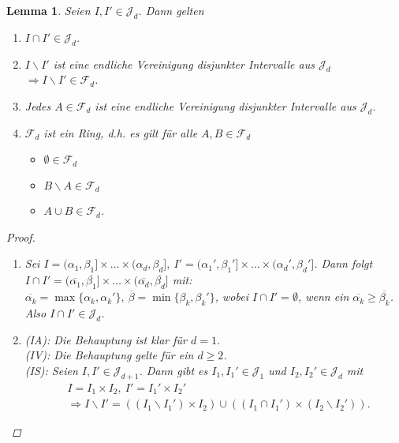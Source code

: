 \documentclass[a4paper]{report}
\newcommand{\Fd}{\mathcal{F}_d}
\newcommand{\Jd}{\mathcal{J}_d}
\newcommand{\jlabel}[1]{\label{j_#1}}
\theoremstyle{plain}
\newtheorem{lem}[thm]{Lemma}
\theoremstyle{definition}
\begin{document}
{{{\begin{lem}
\jlabel{Lem 1.15}
    Seien $I, I' \in \Jd$. Dann gelten
    \begin{enumerate}
        \item $I \cap I' \in \Jd$.
        \item $I\backslash I'$ ist eine endliche Vereinigung disjunkter Intervalle aus $\Jd$ $\Rightarrow I \backslash I' \in \Fd$.
        \item Jedes $A\in \Fd$ ist eine endliche Vereinigung disjunkter Intervalle aus $\Jd$.
        \item 
            $\Fd$ ist ein Ring, d.h. es gilt für alle $A,B\in \Fd$
            \begin{itemize}
                \item[(R1)] $\emptyset \in \Fd$
                \item[(R2)] $B\backslash A \in \Fd$
                \item[(R3)] $A \cup B \in \Fd$.
            \end{itemize}
    \end{enumerate}
    \begin{proof}
        \begin{enumerate}
            \item 
                Sei $I = (\alpha_1, \beta_1] \times \dots \times (\alpha_d, \beta_d], \ I' = (\alpha_1', \beta_1'] \times \dots \times (\alpha_d', \beta_d']$. Dann folgt $I \cap I' = (\overline{\alpha_1}, \overline{\beta_1}] \times \dots \times (\overline{\alpha_d}, \overline{\beta_d}]$ mit:\\
                $\overline{\alpha_k} = \max\{\alpha_k, \alpha_k'\}, \ \overline{\beta} = \min\{\beta_k, \beta_k'\}$, wobei $I\cap I' = \emptyset$, wenn ein $\overline{\alpha_k} \ge \overline{\beta_k}$. Also $I \cap I' \in \Jd$.
            \item
                (IA): Die Behauptung ist klar für $d=1$.\\
                (IV): Die Behauptung gelte für ein $d \ge 2$.\\
                (IS): Seien $I,I' \in \mathcal{J}_{d+1}$. Dann gibt es $I_1, I_1' \in \mathcal{J}_1$ und $I_2, I_2' \in \Jd$ mit
                \begin{displaymath}
                    \begin{split}
                        &I = I_1 \times I_2, \ I' = I_1' \times I_2'\\
                        &\Rightarrow I\backslash I' = ((I_1\backslash I_1')\times I_2)\cup((I_1 \cap I_1')\times(I_2\backslash I_2')).

\end{split}
\end{displaymath}
\end{enumerate}
\end{proof}
\end{lem}}}}
\end{document}
